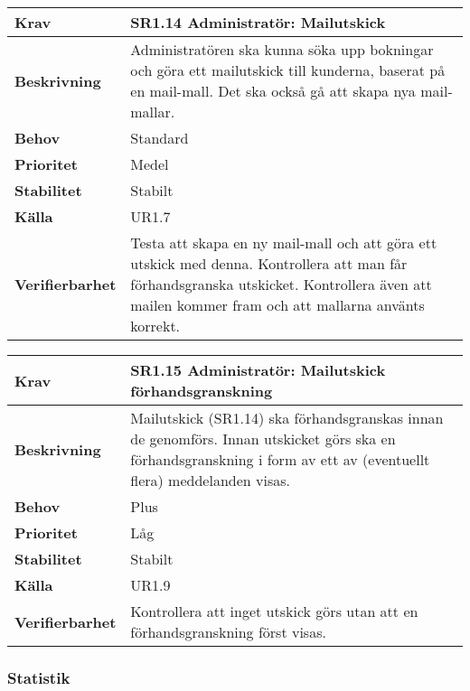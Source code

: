 \documentclass[a4paper, twoside, 11pt, titlepage]{article}
\begin{document}
		\begin{tabular} { p{2.6cm} p{12.5cm} }
			\hline
			\sffamily\textbf{Krav} & \sffamily\textbf{SR1.14 Administratör: Mailutskick } \\
			\hline
			\sffamily\textbf{Beskrivning} & Administratören ska kunna söka upp bokningar och göra ett mailutskick till kunderna, baserat på en mail-mall. Det ska också gå att skapa nya mail-mallar.  \\
			\hline
			\sffamily\textbf{Behov} & Standard  \\
			\hline
			\sffamily\textbf{Prioritet} & Medel  \\
			\hline
			\sffamily\textbf{Stabilitet} & Stabilt  \\
			\hline
			\sffamily\textbf{Källa} & UR1.7  \\
			\hline
			\sffamily\textbf{Verifierbarhet} & Testa att skapa en ny mail-mall och att göra ett utskick med denna. Kontrollera att man får förhandsgranska utskicket. Kontrollera även att mailen kommer fram och att mallarna använts korrekt.  \\
			\hline
		\end{tabular}
		\vspace{6mm}

		\begin{tabular} { p{2.6cm} p{12.5cm} }
			\hline
			\sffamily\textbf{Krav} & \sffamily\textbf{SR1.15 Administratör: Mailutskick förhandsgranskning } \\
			\hline
			\sffamily\textbf{Beskrivning} & Mailutskick (SR1.14) ska förhandsgranskas innan de genomförs. Innan utskicket görs ska en förhandsgranskning i form av ett av (eventuellt flera) meddelanden visas.  \\
			\hline
			\sffamily\textbf{Behov} & Plus  \\
			\hline
			\sffamily\textbf{Prioritet} & Låg  \\
			\hline
			\sffamily\textbf{Stabilitet} & Stabilt  \\
			\hline
			\sffamily\textbf{Källa} & UR1.9  \\
			\hline
			\sffamily\textbf{Verifierbarhet} & Kontrollera att inget utskick görs utan att en förhandsgranskning först visas.  \\
			\hline
		\end{tabular}


		\subsubsection{Statistik}
\end{document}
